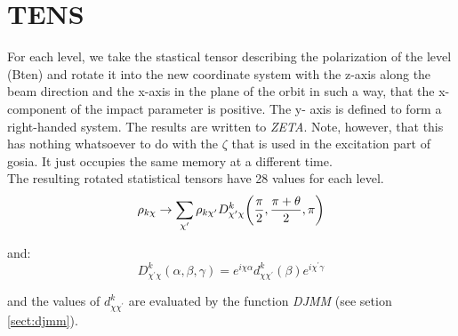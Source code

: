 \section{TENS}
\label{sect:tens}

\noindent For each level, we take the stastical tensor describing the
polarization of the level (Bten) and rotate it into the new coordinate system
with the z-axis along the beam direction and the x-axis in the plane of the
orbit in such a way, that the x-component of the impact parameter is positive.
The y- axis is defined to form a right-handed system. The results are written
to {\em ZETA}. Note, however, that this has nothing whatsoever to do with
the $\zeta$ that is used in the excitation part of gosia. It just occupies
the same memory at a different time.\\

\noindent The resulting rotated statistical tensors have 28 values for each
level.\\

\begin{equation}
\rho_{k \chi} \rightarrow \sum_{\chi^\prime} \rho_{k \chi^\prime}
D^k_{\chi^\prime \chi} \bigg( {\pi \over 2} , {\pi + \theta \over 2}, \pi
\bigg)
\end{equation}

\noindent and:\\

\begin{equation}
D^k_{\chi^\prime \chi}(\alpha, \beta, \gamma) = 
e^{i \chi \alpha} d^k_{\chi \chi^\prime}(\beta) e^{i \chi^\prime \gamma}
\end{equation}

\noindent and the values of $d^k_{\chi \chi^\prime}$ are evaluated by the
function {\em DJMM} (see setion \ref{sect:djmm}).\\
